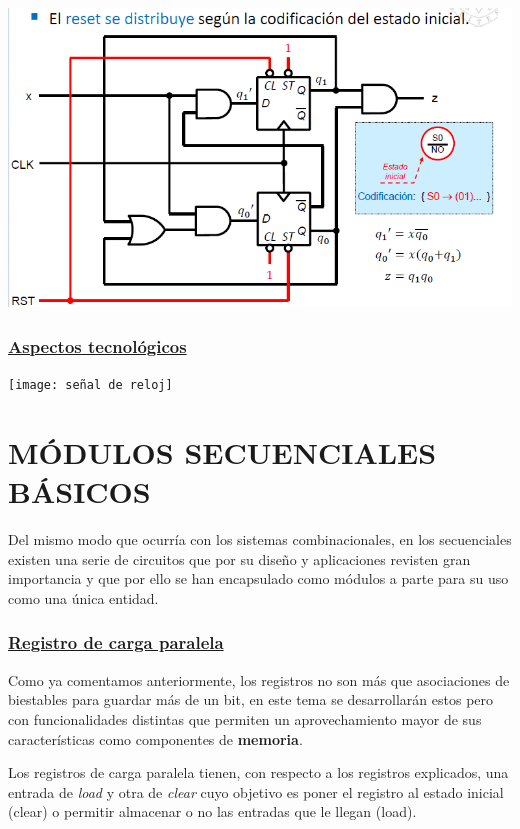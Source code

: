 \documentclass[a4paper,10pt]{book}
\begin{document}
\begin{center}
\includegraphics[scale=0.65]{reset2}
\end{center}

\subsection*{\underline{Aspectos tecnológicos}}
\begin{center}
\texttt{[image: señal de reloj]}
\end{center}

\chapter*{MÓDULOS SECUENCIALES \\ BÁSICOS}
Del mismo modo que ocurría con los sistemas combinacionales, en los secuenciales existen una serie de circuitos que por su diseño y aplicaciones revisten gran importancia y que por ello se han encapsulado como módulos a parte para su uso como una única entidad.

\subsection*{\underline{Registro de carga paralela}}
Como ya comentamos anteriormente, los registros no son más que asociaciones de biestables para guardar más de un bit, en este tema se desarrollarán estos pero con funcionalidades distintas que permiten un aprovechamiento mayor de sus características como componentes de \textbf{memoria}.

Los registros de carga paralela tienen, con respecto a los registros explicados, una entrada de \textit{load} y otra de \textit{clear} cuyo objetivo es poner el registro al estado inicial (clear) o permitir almacenar o no las entradas que le llegan (load).
\end{document}
